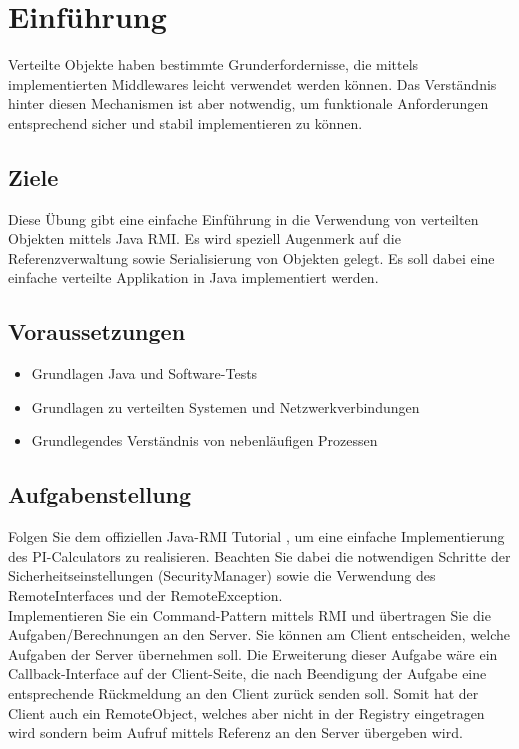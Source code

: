 
\section{Einführung}

Verteilte Objekte haben bestimmte Grunderfordernisse, die mittels implementierten Middlewares leicht verwendet werden können. Das Verständnis hinter diesen Mechanismen ist aber notwendig, um funktionale Anforderungen entsprechend sicher und stabil implementieren zu können.

\subsection{Ziele}

Diese Übung gibt eine einfache Einführung in die Verwendung von verteilten Objekten mittels Java RMI. Es wird speziell Augenmerk auf die Referenzverwaltung sowie Serialisierung von Objekten gelegt. Es soll dabei eine einfache verteilte Applikation in Java implementiert werden.

\subsection{Voraussetzungen}


\begin{itemize}
	\item Grundlagen Java und Software-Tests
    \item Grundlagen zu verteilten Systemen und Netzwerkverbindungen
    \item Grundlegendes Verständnis von nebenläufigen Prozessen
\end{itemize}

\subsection{Aufgabenstellung}

Folgen Sie dem offiziellen Java-RMI Tutorial \cite{javaRMI}, um eine einfache Implementierung des PI-Calculators zu realisieren. Beachten Sie dabei die notwendigen Schritte der Sicherheitseinstellungen (SecurityManager) sowie die Verwendung des RemoteInterfaces und der RemoteException.\\

Implementieren Sie ein Command-Pattern \cite{Command-Pattern} mittels RMI \cite{bsp-command-pattern} und übertragen Sie die Aufgaben/Berechnungen an den Server. Sie können am Client entscheiden, welche Aufgaben der Server übernehmen soll. Die Erweiterung dieser Aufgabe wäre ein Callback-Interface auf der Client-Seite, die nach Beendigung der Aufgabe eine entsprechende Rückmeldung an den Client zurück senden soll. Somit hat der Client auch ein RemoteObject, welches aber nicht in der Registry eingetragen wird sondern beim Aufruf mittels Referenz an den Server übergeben wird.
\clearpage
